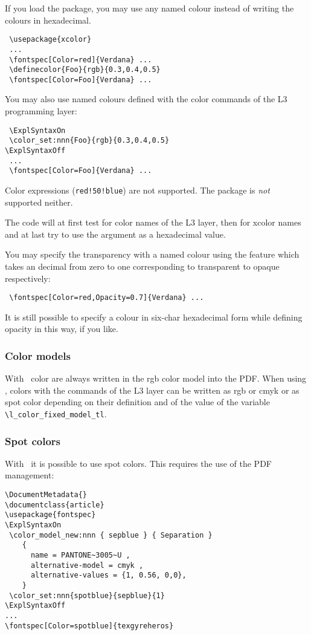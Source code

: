 \documentclass[a4paper]{l3doc}
\begin{document}
If you load the  package, you may use any named colour instead
of writing the colours in hexadecimal.
\begin{Verbatim}
 \usepackage{xcolor}
 ...
 \fontspec[Color=red]{Verdana} ...
 \definecolor{Foo}{rgb}{0.3,0.4,0.5}
 \fontspec[Color=Foo]{Verdana} ...
\end{Verbatim}

You may also use named colours defined with the color commands of the L3 
programming layer:
\begin{Verbatim}
 \ExplSyntaxOn
 \color_set:nnn{Foo}{rgb}{0.3,0.4,0.5}
\ExplSyntaxOff
 ...
 \fontspec[Color=Foo]{Verdana} ...
\end{Verbatim}

Color expressions (\verb+red!50!blue+) are not supported. The  
package is \emph{not} supported neither. 

The code will at first test for color names of the L3 layer, then for xcolor 
names and at last try to use the argument as a hexadecimal value.

You may specify the transparency with a named colour using the  
feature which takes an decimal from zero to one corresponding to transparent 
to opaque respectively: 
\begin{Verbatim}
 \fontspec[Color=red,Opacity=0.7]{Verdana} ...
\end{Verbatim}
It is still possible to specify a colour in six-char hexadecimal form
while defining opacity in this way, if you like.

\subsubsection{Color models}

With \XeTeX\ color are always written in the rgb color model into the PDF. 
When using \LuaTeX, colors with the commands of the L3 layer can be written 
as rgb or cmyk or as spot color depending on their definition and of the 
value of the variable \verb+\l_color_fixed_model_tl+. 
 
\subsubsection{Spot colors} 
With \LuaTeX\ it is possible to use spot colors. This requires the use of the 
PDF management:
\begin{Verbatim}
\DocumentMetadata{}
\documentclass{article}
\usepackage{fontspec}
\ExplSyntaxOn
 \color_model_new:nnn { sepblue } { Separation }
    {
      name = PANTONE~3005~U ,
      alternative-model = cmyk ,
      alternative-values = {1, 0.56, 0,0},
    }
 \color_set:nnn{spotblue}{sepblue}{1}
\ExplSyntaxOff
...
\fontspec[Color=spotblue]{texgyreheros}
\end{Verbatim}
\end{document}
